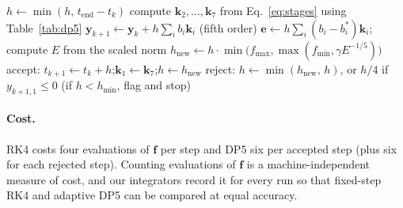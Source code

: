 \begin{algorithm}[ht]
\caption{One adaptive DP5 step from $t_k$ (with $\mathbf{k}_1=\mathbf{f}(t_k,\mathbf{y}_k)$ carried over by FSAL)}
\label{alg:dp5}
\begin{algorithmic}[1]
\Repeat
  \State $h\gets\min(h,\,t_{\mathrm{end}}-t_k)$
  \State compute $\mathbf{k}_2,\dots,\mathbf{k}_7$ from Eq.~\eqref{eq:stages} using Table~\ref{tab:dp5}
  \State $\mathbf{y}_{k+1}\gets\mathbf{y}_k+h\sum_i b_i\mathbf{k}_i$ \hfill (fifth order)
  \State $\mathbf{e}\gets h\sum_i (b_i-b_i^{*})\mathbf{k}_i$; \quad compute $E$ from the scaled norm
  \State $h_{\mathrm{new}}\gets h\cdot\min\!\big(f_{\max},\max(f_{\min},\gamma E^{-1/5})\big)$
     \State accept: $t_{k+1}\gets t_k+h$;\quad $\mathbf{k}_1\gets\mathbf{k}_7$;\quad $h\gets h_{\mathrm{new}}$
  \Else
     \State reject: $h\gets\min(h_{\mathrm{new}},\,h)$, or $h/4$ if $y_{k+1,1}\le0$ \hfill (if $h<h_{\min}$, flag and stop)
  \EndIf
{}
\end{algorithmic}
\end{algorithm}

\paragraph{Cost.} RK4 costs four evaluations of $\mathbf{f}$ per step and DP5 six per accepted step (plus six for each rejected step). Counting evaluations of $\mathbf{f}$ is a machine-independent measure of cost, and our integrators record it for every run so that fixed-step RK4 and adaptive DP5 can be compared at equal accuracy.
